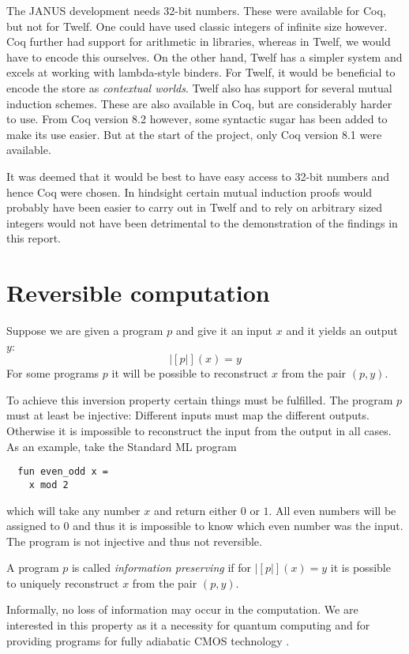 
The JANUS development needs 32-bit numbers. These were available
for Coq, but not for Twelf. One could have used classic integers of
infinite size however. Coq further had support for arithmetic in
libraries, whereas in Twelf, we would have to encode this
ourselves. On the other hand, Twelf has a simpler system and excels at
working with lambda-style binders. For Twelf, it would be beneficial
to encode the store as \emph{contextual worlds}. Twelf also has
support for several mutual induction schemes. These are also available
in Coq, but are considerably harder to use. From Coq version 8.2
however, some syntactic sugar has been added to make its use
easier. But at the start of the project, only Coq version 8.1 were
available.


It was deemed that it would be best to have easy access to 32-bit
numbers and hence Coq were chosen. In hindsight certain mutual
induction proofs would probably have been easier to carry out in Twelf
and to rely on arbitrary sized integers would not have been
detrimental to the demonstration of the findings in this report.

\section{Reversible computation}
\label{sec:revers-comp}

Suppose we are given a program $p$ and give it an input $x$ and it
yields an output $y$:
\begin{equation*}
  |[p|](x) = y
\end{equation*}
For some programs $p$ it will be possible to reconstruct $x$ from the
pair $(p, y)$.

To achieve this inversion property certain things must be
fulfilled. The program $p$ must at least be injective: Different
inputs must map the different outputs. Otherwise it is impossible to
reconstruct the input from the output in all cases. As an example,
take the Standard ML program
\begin{verbatim}
  fun even_odd x =
    x mod 2
\end{verbatim}
which will take any number $x$ and return either $0$ or $1$. All even
numbers will be assigned to $0$ and thus it is impossible to know
which even number was the input. The program is not injective and thus
not reversible.

\begin{defn}
  A program $p$ is called \emph{information preserving} if for
  $|[p|](x) = y$ it is possible to uniquely reconstruct $x$ from the
  pair $(p, y)$.
\end{defn}
Informally, no loss of information may occur in the computation. We
are interested in this property as it a necessity for quantum
computing  and for providing programs for fully
adiabatic CMOS technology .

